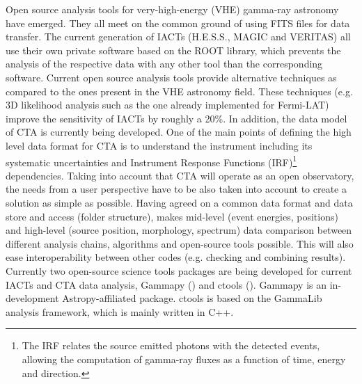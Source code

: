 Open source analysis tools for very-high-energy (VHE) gamma-ray astronomy have emerged. They all meet on the common ground of using FITS files for data transfer. The current generation of IACTs (H.E.S.S., MAGIC and VERITAS) all use their own private software based on the ROOT library, which prevents the analysis of the respective data with any other tool than the corresponding software. Current open source analysis tools provide alternative techniques as compared to the ones present in the VHE astronomy field. These techniques (e.g. 3D likelihood analysis such as the one already implemented for Fermi-LAT) improve the sensitivity of IACTs by roughly a 20\%. In addition, the data model of CTA is currently being developed. One of the main points of defining the high level data format for CTA is to understand the instrument including its systematic uncertainties and Instrument Response Functions (IRF)\footnote{The IRF relates the source emitted photons with the detected events, allowing the computation of gamma-ray fluxes as a function of time, energy and direction.} dependencies. Taking into account that CTA will operate as an open observatory, the needs from a user perspective have to be also taken into account to create a solution as simple as possible. Having agreed on a common data format and data store and access (folder structure), makes mid-level (event energies, positions) and high-level (source position, morphology, spectrum) data comparison between different analysis chains, algorithms and open-source tools possible. This will also ease interoperability between other codes (e.g. checking and combining results). Currently two open-source science tools packages are being developed for current IACTs and CTA data analysis, Gammapy (\cite{2015arXiv150907408D}) and ctools (\cite{2016AnA...593A...1K}). Gammapy is an in-development Astropy-affiliated package. ctools is based on the GammaLib analysis framework, which is mainly written in C++.


